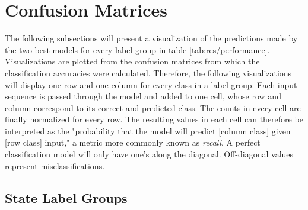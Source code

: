 \newpage
\section{Confusion Matrices} \label{sec:res/confusion}

The following subsections will present a visualization of the predictions made by the two best models for every label group in table \ref{tab:res/performance}. Visualizations are plotted from the confusion matrices from which the classification accuracies were calculated. Therefore, the following visualizations will display one row and one column for every class in a label group. Each input sequence is passed through the model and added to one cell, whose row and column correspond to its correct and predicted class. The counts in every cell are finally normalized for every row. The resulting values in each cell can therefore be interpreted as the "probability that the model will predict [column class] given [row class] input," a metric more commonly known as \textit{recall}. A perfect classification model will only have one's along the diagonal. Off-diagonal values represent misclassifications.

\subsection{State Label Groups}


